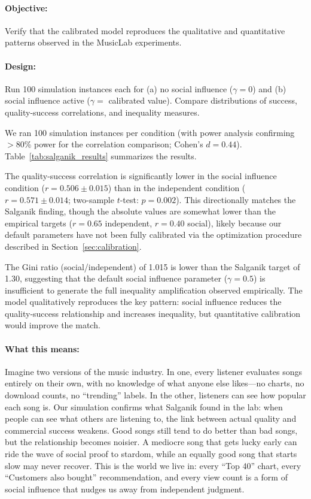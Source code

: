 \documentclass[11pt,a4paper]{article}
\begin{document}
\paragraph{Objective:} Verify that the calibrated model reproduces the qualitative and quantitative patterns observed in the MusicLab experiments.

\paragraph{Design:} Run 100 simulation instances each for (a) no social influence ($\gamma = 0$) and (b) social influence active ($\gamma = $ calibrated value). Compare distributions of success, quality-success correlations, and inequality measures.

We ran 100 simulation instances per condition (with power analysis confirming $>$80\% power for the correlation comparison; Cohen's $d = 0.44$). Table~\ref{tab:salganik_results} summarizes the results.



The quality-success correlation is significantly lower in the social influence condition ($r = 0.506 \pm 0.015$) than in the independent condition ($r = 0.571 \pm 0.014$; two-sample $t$-test: $p = 0.002$). This directionally matches the Salganik finding, though the absolute values are somewhat lower than the empirical targets ($r = 0.65$ independent, $r = 0.40$ social), likely because our default parameters have not been fully calibrated via the optimization procedure described in Section~\ref{sec:calibration}.

The Gini ratio (social/independent) of 1.015 is lower than the Salganik target of 1.30, suggesting that the default social influence parameter ($\gamma = 0.5$) is insufficient to generate the full inequality amplification observed empirically. The model qualitatively reproduces the key pattern: social influence reduces the quality-success relationship and increases inequality, but quantitative calibration would improve the match.

\paragraph{What this means:} Imagine two versions of the music industry. In one, every listener evaluates songs entirely on their own, with no knowledge of what anyone else likes---no charts, no download counts, no ``trending'' labels. In the other, listeners can see how popular each song is. Our simulation confirms what Salganik found in the lab: when people can see what others are listening to, the link between actual quality and commercial success weakens. Good songs still tend to do better than bad songs, but the relationship becomes noisier. A mediocre song that gets lucky early can ride the wave of social proof to stardom, while an equally good song that starts slow may never recover. This is the world we live in: every ``Top 40'' chart, every ``Customers also bought'' recommendation, and every view count is a form of social influence that nudges us away from independent judgment.
\end{document}
